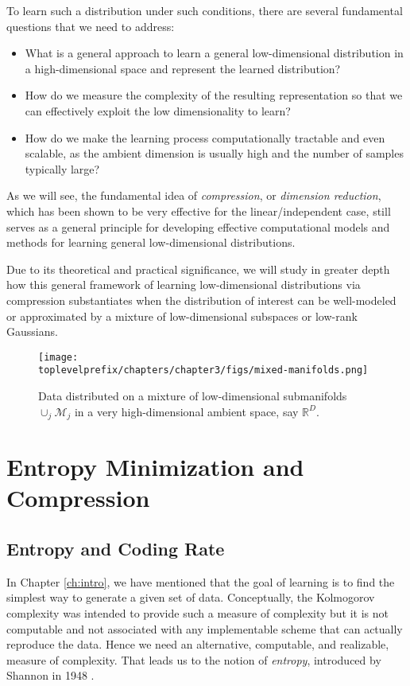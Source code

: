 \documentclass[../../book-main.tex]{subfiles}
\begin{document}
To learn such a distribution under such conditions, there are several fundamental questions that we need to address:
\begin{itemize}
	\item What is a general approach to learn a general low-dimensional distribution in a high-dimensional space and represent the learned distribution?
	\item How do we measure the complexity of the resulting representation so that we can effectively exploit the low dimensionality to learn?
	\item How do we make the learning process computationally tractable and even scalable, as the ambient dimension is usually high and the number of samples typically large?
\end{itemize}
As we will see, the fundamental idea of {\em compression}, or {\em dimension reduction}, which has been shown to be very effective for the linear/independent case, still serves as a general principle for developing effective computational models and methods for learning general low-dimensional distributions.

Due to its theoretical and practical significance, we will study in greater
depth how this general framework of learning low-dimensional distributions via compression substantiates when the distribution of interest can be well-modeled or approximated by a mixture of low-dimensional subspaces or low-rank Gaussians.

\begin{figure}
    \centering
    \texttt{[image: \\toplevelprefix/chapters/chapter3/figs/mixed-manifolds.png]}
    \caption{Data distributed on a mixture of low-dimensional submanifolds $\cup_j \mathcal{M}_j$ in a very high-dimensional ambient space, say $\mathbb{R}^D$.}
    \label{fig:mixture-manifolds}
\end{figure}


\section{Entropy Minimization and Compression}

\subsection{Entropy and Coding Rate}
In Chapter \ref{ch:intro}, we have mentioned that the goal of learning is to find the simplest way to generate a given set of data. Conceptually, the Kolmogorov complexity was intended to provide such a measure of complexity but it is not computable and not associated with any implementable scheme that can actually reproduce the data. Hence we need an alternative, computable, and realizable, measure of complexity. That leads us to the notion of {\em entropy}, introduced by Shannon in 1948 \cite{Shannon-1948}.
\end{document}
